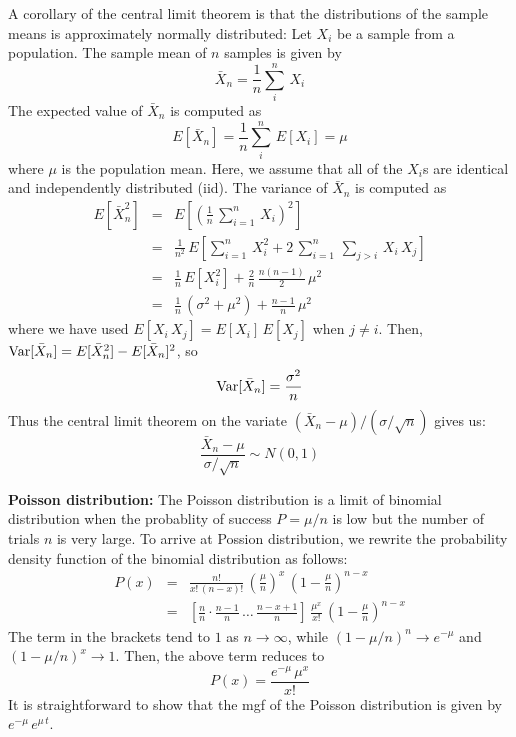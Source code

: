 \documentclass[aps,prl,preprint,superscriptaddress]{revtex4-1}
\begin{document}
A corollary of the central limit theorem is that the distributions of the sample means is
approximately normally distributed: Let $X_i$ be a sample from a population. The sample mean of $n$ samples
is given by
%
\begin{equation}
\bar{X}_n = \frac{1}{n} \sum_i^n\, X_i
\end{equation}
%
The expected value of $\bar{X}_n$ is computed as
%
\begin{equation}
E[\bar{X}_n] = \frac{1}{n}\sum_i^n\, E[X_i] = \mu
\end{equation}
%
where $\mu$ is the population mean. Here, we assume that all of the $X_i$s are identical and independently
distributed (iid). The variance of $\bar{X}_n$ is computed as
%
\begin{eqnarray}
E[\bar{X}_n^2] &=& E\left[ \left( \frac{1}{n}\, \sum_{i=1}^n\, X_i \right)^2 \right] \nonumber\\
               &=& \frac{1}{n^2}\, E\left[ \sum_{i=1}^n\, X_i^2 + 2\, \sum_{i=1}^n\, \sum_{j>i}\, X_i\, X_j \right] \nonumber\\
               &=& \frac{1}{n}\, E[X_i^2] + \frac{2}{n}\, \frac{n (n-1)}{2}\, \mu^2 \nonumber\\
               &=& \frac{1}{n}\, (\sigma^2 + \mu^2) + \frac{n-1}{n}\, \mu^2
\end{eqnarray}
%
where we have used $E[X_i\, X_j] = E[X_i]\, E[X_j]$ when $j\neq i$.
Then, ${\rm Var}[\bar{X}_n] = E[\bar{X}_n^2] - E[\bar{X}_n]^2$, so
%
\begin{equation}
{\rm Var}[\bar{X}_n] = \frac{\sigma^2}{n}
\end{equation}
%
Thus the central limit theorem on the variate $(\bar{X}_n - \mu)/(\sigma/\sqrt{n})$ gives us:
%
\begin{equation}
\frac{\bar{X}_n - \mu}{\sigma/\sqrt{n}} \sim N(0,1)
\end{equation}
%

\vspace{0.5cm}

{\bf Poisson distribution:} The Poisson distribution is a limit of binomial distribution when the probablity of 
success $P = \mu/n$ is low but the number of trials $n$ is very large. To arrive at Possion distribution, we rewrite the 
probability density function of the binomial distribution as follows:
%
\begin{eqnarray}
P(x) &=& \frac{n!}{x!\, (n-x)!}\, \left(\frac{\mu}{n}\right)^x\, \left( 1 - \frac{\mu}{n} \right)^{n-x} \nonumber\\
     &=& \left[ \frac{n}{n} \cdot \frac{n-1}{n}\, \dots \, \frac{n-x+1}{n} \right]\, \frac{\mu^x}{x!}\, 
         \left( 1 - \frac{\mu}{n} \right)^{n-x}
\end{eqnarray}
%
The term in the brackets tend to $1$ as $n\rightarrow \infty$, while $(1-\mu/n)^n \rightarrow e^{-\mu}$ and
$(1-\mu/n)^x \rightarrow 1$. Then, the above term reduces to
%
\begin{equation}
P(x) = \frac{e^{-\mu}\, \mu^x}{x!}
\end{equation}
%
It is straightforward to show that the mgf of the Poisson distribution is given by $e^{-\mu}\, e^{\mu\, t}$.
\end{document}
